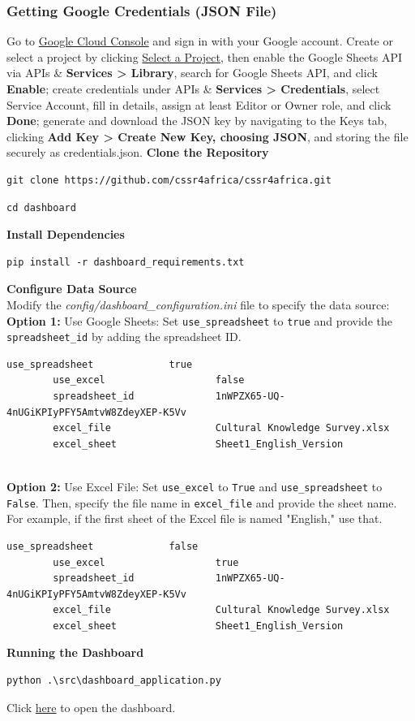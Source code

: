 \documentclass{CSSRforAfrica}
\begin{document}
\subsubsection*{Getting Google Credentials (JSON File)}
Go to \href{https://console.cloud.google.com/}{Google Cloud Console} and sign in with your Google account. Create or select a project by clicking \href{https://console.cloud.google.com/}{Select a Project}, then enable the Google Sheets API via APIs \& \textbf{Services > Library}, search for Google Sheets API, and click\textbf{ Enable}; create credentials under APIs \& \textbf{Services > Credentials}, select Service Account, fill in details, assign at least Editor or Owner role, and click \textbf{Done}; generate and download the JSON key by navigating to the Keys tab, clicking \textbf{Add Key > Create New Key, choosing JSON}, and storing the file securely as credentials.json.
\newpage
\noindent
\textbf{Clone the Repository}
\begin{lstlisting}[style=linuxbashstyle]
git clone https://github.com/cssr4africa/cssr4africa.git
\end{lstlisting}
\begin{lstlisting}[style=linuxbashstyle]
cd dashboard
\end{lstlisting}
\textbf{Install Dependencies}
\begin{lstlisting}[style=linuxbashstyle]
pip install -r dashboard_requirements.txt
\end{lstlisting}
\textbf{Configure Data Source}\\[1em]
Modify the \textit{config/dashboard\_configuration.ini} file to specify the data source:\\[1em]
\textbf{Option 1:} Use Google Sheets: Set \texttt{use\_spreadsheet} to \texttt{true} and provide the \texttt{spreadsheet\_id} by adding the spreadsheet ID.
\begin{lstlisting}[style=linuxbashstyle]
        use_spreadsheet             true
        use_excel                   false
        spreadsheet_id              1nWPZX65-UQ-4nUGiKPIyPFY5AmtvW8ZdeyXEP-K5Vv
        excel_file                  Cultural Knowledge Survey.xlsx
        excel_sheet                 Sheet1_English_Version
        
\end{lstlisting}
\noindent \textbf{Option 2:} Use Excel File: Set \texttt{use\_excel} to \texttt{True} and \texttt{use\_spreadsheet} to \texttt{False}. Then, specify the file name in \texttt{excel\_file} and provide the sheet name. For example, if the first sheet of the Excel file is named "English," use that.
\begin{lstlisting}[style=linuxbashstyle]
        use_spreadsheet             false
        use_excel                   true
        spreadsheet_id              1nWPZX65-UQ-4nUGiKPIyPFY5AmtvW8ZdeyXEP-K5Vv
        excel_file                  Cultural Knowledge Survey.xlsx
        excel_sheet                 Sheet1_English_Version
\end{lstlisting}
 \textbf{Running the Dashboard}
\begin{lstlisting}[style=linuxbashstyle]
python .\src\dashboard_application.py
\end{lstlisting}
Click \href{http://127.0.0.1:8050/}{here} to open the dashboard.
\end{document}
